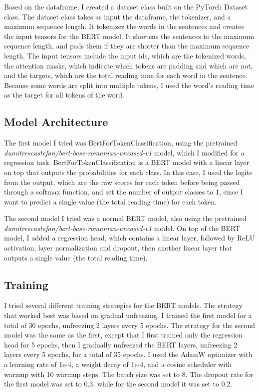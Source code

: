 Based on the dataframe, I created a dataset class built on the PyTorch Dataset class. The dataset class takes as input the dataframe, the tokenizer, and a maximum sequence length. It tokenizez the words in the sentences and creates the input tensors for the BERT model. It shortens the sentences to the maximum sequence length, and pads them if they are shorter than the maximum sequence length. The input tensors include the input ids, which are the tokenized words, the attention masks, which indicate which tokens are padding and which are not, and the targets, which are the total reading time for each word in the sentence. Because some words are split into multiple tokens, I used the word's reading time as the target for all tokens of the word.

\subsection{Model Architecture}
The first model I tried was BertForTokenClassification, using the pretrained \textit{dumitrescustefan/bert-base-romanian-uncased-v1} model, which I modified for a regression task. BertForTokenClassification is a BERT model with a linear layer on top that outputs the probabilities for each class. In this case, I used the logits from the output, which are the raw scores for each token before being passed through a softmax function, and set the number of output classes to 1, since I want to predict a single value (the total reading time) for each token. 

The second model I tried was a normal BERT model, also using the pretrained \textit{dumitrescustefan/bert-base-romanian-uncased-v1} model. On top of the BERT model, I added a regression head, which contains a linear layer, followed by ReLU activation, layer normalization and dropout, then another linear layer that outputs a single value (the total reading time). 

\subsection{Training}
I tried several different training strategies for the BERT models. The strategy that worked best was based on gradual unfreezing. I trained the first model for a total of 30 epochs, unfreezing 2 layers every 5 epochs. The strategy for the second model was the same as the first, except that I first trained only the regression head for 5 epochs, then I gradually unfreezed the BERT layers, unfreezing 2 layers every 5 epochs, for a total of 35 epochs. I used the AdamW optimizer with a learning rate of 1e-4, a weight decay of 1e-4, and a cosine scheduler with warmup with 10 warmup steps. The batch size was set to 8. The dropout rate for the first model was set to 0.3, while for the second model it was set to 0.2. 


